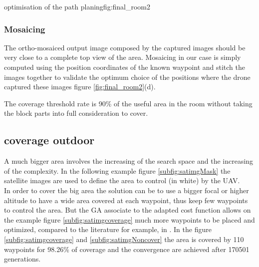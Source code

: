  \begin{mfigures}[!]{optimisation of the path planing}{fig:final_room2} \centering
{}
\hspace{1cm}
\end{mfigures} 

 
 \subsubsection{Mosaicing}

The ortho-mosaiced output image composed by the captured
images should be very close to a complete top view of the area.
Mosaicing in our case is simply computed using the position coordinates of the known waypoint and stitch the images together to validate the optimum choice of the positions where the drone captured these images figure \ref{fig:final_room2}(d).

The coverage threshold rate is 90\% of the useful area in the room without taking the block parts into full consideration to cover.
 
 

\subsection{coverage outdoor}\label{coverageOutDoor}
 A much bigger area involves the increasing of the search space and the increasing of the complexity. 
In the following example figure \ref{subfig:satimgMask} the satellite images are used to define the area to control (in white)  by the UAV. \\
In order to cover the big area the solution can be to use a bigger focal or higher altitude to have a wide area covered at each waypoint, thus keep few waypoints to control the area. But the GA associate to the adapted cost function allows on the example figure \ref{subfig:satimgcoverage} much more waypoints to be placed and optimized, compared to the literature for example, in \cite{c10,c11}. In the figure \ref{subfig:satimgcoverage} and \ref{subfig:satimgNoncover} the area is covered by 110 waypoints for 98.26$\%$ of coverage and the convergence are achieved after 170501 generations.\\



